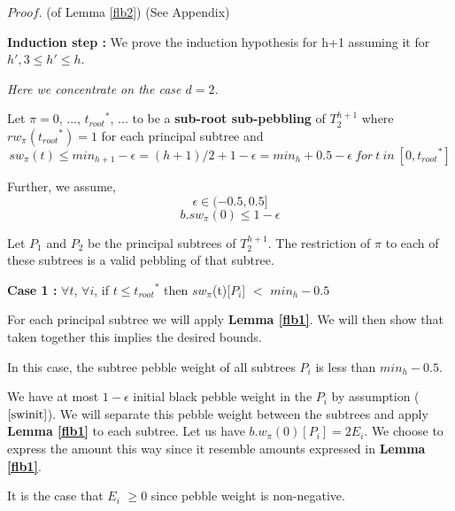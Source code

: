 \documentclass[oribib1]{llncs}
\newcommand{\troots}{{t_{root}}^*}
\begin{document}
\medskip

\noindent
$Proof.$ (of Lemma \ref{flb2})  (See Appendix)
 
 

\bigskip

\noindent
{\bf Induction step :} We prove the induction hypothesis for h+1 assuming it for $h', 3\le h' \le h$.

{\em Here we concentrate on the case $d=2$.}

\bigskip

Let $\pi = 0$, ..., $\troots$, ... to be a {\bf sub-root sub-pebbling}
of $T^{h+1}_2$ where $rw_\pi(\troots) =1$ for each principal
subtree  and
 \begin{equation}sw_{\pi}(t) \leq min_{h+1} - \epsilon = (h+1)/2 + 1- \epsilon=  min_h +  0.5 - \epsilon~for~t~in~[0, \troots]\label{rtotal}\end{equation} 

\noindent
Further, we assume,
\begin{equation}\epsilon \in (-0.5,0.5]\label{aeps}\end{equation} 
\begin{equation}b.sw_{\pi}(0) \leq 1-\epsilon\label{swinit}\end{equation} 


Let $P_1$ and $P_2$ be the principal subtrees of $T^{h+1}_2$.
The restriction of $\pi$ to each of these subtrees is a valid
pebbling of that subtree.

\medskip

\noindent
{\bf Case 1 :} $\forall t$, $\forall i$, if $t \leq \troots$ then $sw_{\pi}$(t)[$P_i$] $<$ $min_h-0.5$ 

For each principal subtree we will apply {\bf Lemma \ref{flb1}}. We will then show that taken together this implies the desired bounds.

\medskip

In this case, the subtree pebble weight of all subtrees  $P_i$ is less than $min_h-0.5$.

We have at most $1 - \epsilon$ initial black pebble weight in the $P_i$ by assumption ($\ref{swinit}$). We will separate this pebble weight between the subtrees and apply {\bf Lemma \ref{flb1}} to each subtree. Let us have $b.w_{\pi}(0)[P_i] = 2E_i$. We choose to express the amount this way since it resemble amounts expressed in {\bf Lemma \ref{flb1}}.

\medskip

It is the case that $E_i$ $\geq 0$ since pebble weight is non-negative.
\end{document}
